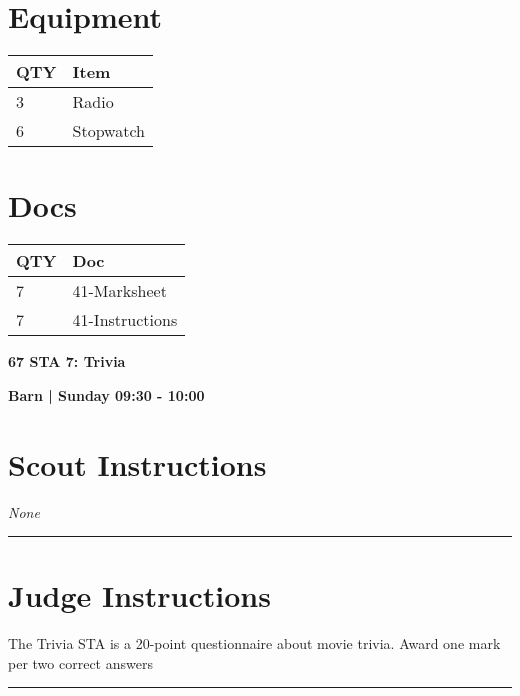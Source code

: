 \documentclass[10pt]{article}
\newcommand{\newtitle}[1]{\begin{center}{\Huge\bfseries #1 }\\ \vspace{5mm}\end{center}}
\newcommand{\newsubtitle}[1]{\begin{center}{\color{grey}\Large\bfseries #1 }\\ \vspace{5mm}\end{center}}
\begin{document}
	\begin{multicols}{2}

		\section*{\faWrench \: Equipment}

		
	\begin{center}
			\begin{tabular}{p{2cm}p{4cm}}


				\textbf{QTY} & \textbf{Item} \\\toprule
												3&Radio\\\midrule
												6&Stopwatch\\\midrule
								\end{tabular}

			\end{center}

		
		\vfill\null
		\columnbreak

			\section*{\faFile \: Docs}
		 	\begin{center}
			\begin{tabular}{p{2cm}p{4cm}}

			\textbf{QTY} & \textbf{Doc} \\\toprule
										7&41-Marksheet\\\midrule
										7&41-Instructions\\\midrule
							\end{tabular}
			\end{center}
	

		\vfill\null

		\end{multicols}



	\vspace{1cm}


	\clearpage
		\newtitle{67 STA 7: Trivia }
	\newsubtitle{Barn | Sunday 09:30 - 10:00}
		\setcounter{section}{66}
	\section*{Scout Instructions}
		\textit{None}
	
	\vspace{0.5cm}
	\hrule
	\vspace{0.5cm}

		\section*{Judge Instructions}
		The Trivia STA is a 20-point questionnaire about movie trivia. Award one mark per two correct answers
\vspace{0.5cm}
	\hrule
	\vspace{0.5cm}
\end{document}
